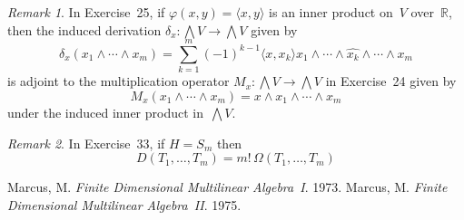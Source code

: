 \documentclass[letterpaper,12pt]{article}
\newcommand{\R}{\mathbb{R}}
\newcommand{\eprod}{\wedge}
\newcommand{\bigeprod}{\bigwedge}
\newcommand{\medeprod}{{\textstyle\bigeprod}}
\newcommand{\delete}{\widehat}
\newcommand{\sprod}[2]{\langle#1,#2\rangle}
\newcommand{\multi}[4]{#2_{#3}#1\cdots#1#2_{#4}}
\newcommand{\eprods}[3]{\multi{\eprod}{#1}{#2}{#3}}
\theoremstyle{definition}
\theoremstyle{remark}
\newtheorem*{rmk}{Remark}
\begin{document}
\begin{rmk}
In Exercise~25, if \(\varphi(x,y)=\sprod{x}{y}\) is an inner product on~\(V\) over~\(\R\), then the induced derivation \(\delta_x:\medeprod V\to\medeprod V\) given by
\[\delta_x(\eprods{x}{1}{m})=\sum_{k=1}^m(-1)^{k-1}\sprod{x}{x_k}x_1\eprod\cdots\eprod\delete{x_k}\eprod\cdots\eprod x_m\]
is adjoint to the multiplication operator \(M_x:\medeprod V\to\medeprod V\) in Exercise~24 given by
\[M_x(\eprods{x}{1}{m})=x\eprod\eprods{x}{1}{m}\]
under the induced inner product in~\(\medeprod V\).
\end{rmk}

\begin{rmk}
In Exercise~33, if \(H=S_m\) then
\[D(T_1,\ldots,T_m)=m!\,\Omega(T_1,\ldots,T_m)\]
\end{rmk}

\newpage
\begin{thebibliography}{0}
 Marcus, M. \textit{Finite Dimensional Multilinear Algebra~I}. 1973.
 Marcus, M. \textit{Finite Dimensional Multilinear Algebra~II}. 1975.
\end{thebibliography}
\end{document}
